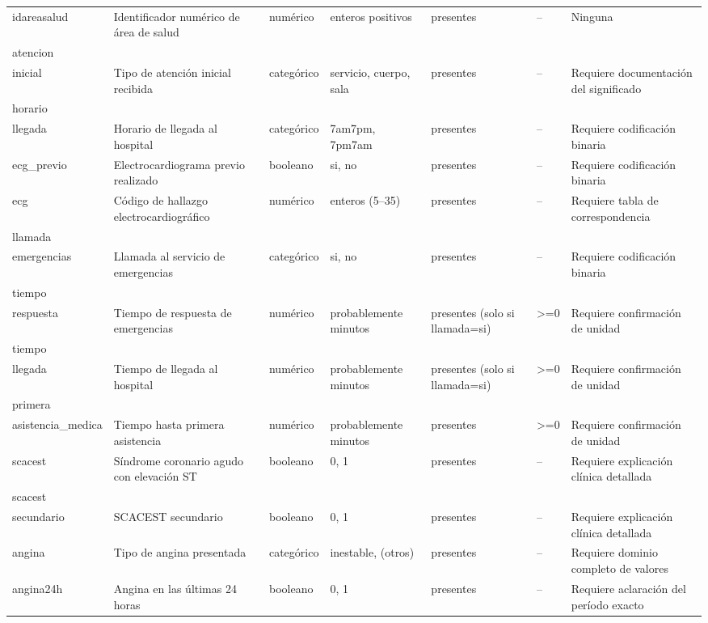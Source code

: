 \documentclass[11pt,a4paper]{article}
\begin{document}
\begin{longtable}{@{}L{0.095\textwidth} L{0.17\textwidth} L{0.07\textwidth} L{0.16\textwidth} L{0.14\textwidth} L{0.13\textwidth} L{0.15\textwidth}@{}}
idareasalud & Identificador numérico de área de salud & numérico & enteros positivos & presentes & -- & Ninguna \\
atencion\\inicial & Tipo de atención inicial recibida & categórico & servicio, cuerpo, sala & presentes & -- & Requiere documentación del significado \\
horario\\llegada & Horario de llegada al hospital & categórico & 7am7pm, 7pm7am & presentes & -- & Requiere codificación binaria \\
ecg\_previo & Electrocardiograma previo realizado & booleano & si, no & presentes & -- & Requiere codificación binaria \\
ecg & Código de hallazgo electrocardiográfico & numérico & enteros (5--35) & presentes & -- & Requiere tabla de correspondencia \\
llamada\\emergencias & Llamada al servicio de emergencias & categórico & si, no & presentes & -- & Requiere codificación binaria \\
tiempo\\respuesta & Tiempo de respuesta de emergencias & numérico & probablemente minutos & presentes (solo si llamada=si) & >=0 & Requiere confirmación de unidad \\
tiempo\\llegada & Tiempo de llegada al hospital & numérico & probablemente minutos & presentes (solo si llamada=si) & >=0 & Requiere confirmación de unidad \\
primera\\asistencia\_medica & Tiempo hasta primera asistencia & numérico & probablemente minutos & presentes & >=0 & Requiere confirmación de unidad \\
scacest & Síndrome coronario agudo con elevación ST & booleano & 0, 1 & presentes & -- & Requiere explicación clínica detallada \\
scacest\\secundario & SCACEST secundario & booleano & 0, 1 & presentes & -- & Requiere explicación clínica detallada \\
angina & Tipo de angina presentada & categórico & inestable, (otros) & presentes & -- & Requiere dominio completo de valores \\
angina24h & Angina en las últimas 24 horas & booleano & 0, 1 & presentes & -- & Requiere aclaración del período exacto \\

\end{longtable}
\end{document}

